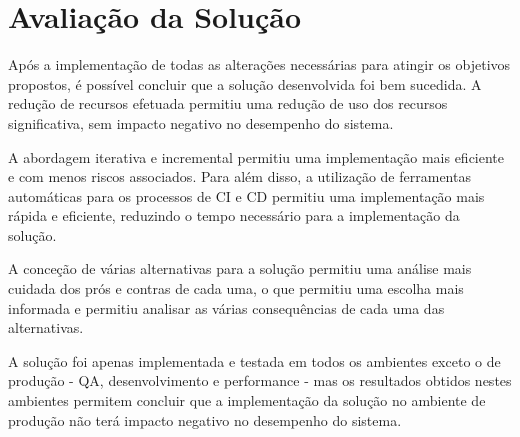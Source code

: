 \section{Avaliação da Solução}

Após a implementação de todas as alterações necessárias para atingir os objetivos propostos, é
possível concluir que a solução desenvolvida foi bem sucedida. A redução de recursos efetuada
permitiu uma redução de uso dos recursos significativa, sem impacto negativo no desempenho do sistema.

A abordagem iterativa e incremental permitiu uma implementação mais eficiente e com menos riscos
associados. Para além disso, a utilização de ferramentas automáticas para os processos de \ac{CI} e
\ac{CD} permitiu uma implementação mais rápida e eficiente, reduzindo o tempo necessário para a 
implementação da solução.

A conceção de várias alternativas para a solução permitiu uma análise mais cuidada dos prós e contras
de cada uma, o que permitiu uma escolha mais informada e permitiu analisar as várias consequências
de cada uma das alternativas.

A solução foi apenas implementada e testada em todos os ambientes exceto o de produção - \ac{QA},
desenvolvimento e performance - mas os resultados obtidos nestes ambientes permitem concluir que a
implementação da solução no ambiente de produção não terá impacto negativo no desempenho do sistema.

